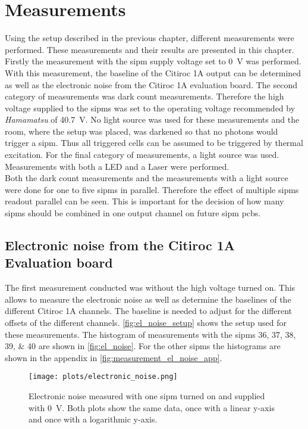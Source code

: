 \chapter{Measurements}

Using the setup described in the previous chapter, different measurements were performed. These measurements and their results are presented in this chapter.\\
Firstly the measurement with the \ac{sipm} supply voltage set to \SI{0}{\volt} was performed. With this measurement, the baseline of the Citiroc 1A output can be determined as well as the electronic noise from the Citiroc 1A evaluation board. The second category of measurements was dark count measurements. Therefore the high voltage supplied to the \ac{sipm}s was set to the operating voltage recommended by \textit{Hamamatsu} of \SI{40.7}{\volt}. No light source was used for these measurements and the room, where the setup was placed, was darkened so that no photons would trigger a \ac{sipm}. Thus all triggered cells can be assumed to be triggered by thermal excitation. For the final category of measurements, a light source was used. Measurements with both a LED and a Laser were performed.\\
Both the dark count measurements and the measurements with a light source were done for one to five \ac{sipm}s in parallel. Therefore the effect of multiple \ac{sipm}s readout parallel can be seen. This is important for the decision of how many \ac{sipm}s should be combined in one output channel on future \ac{sipm} \ac{pcb}s.

\section{Electronic noise from the Citiroc 1A Evaluation board}
The first measurement conducted was without the high voltage turned on. This allows to measure the electronic noise as well as determine the baselines of the different Citiroc 1A channels. The baseline is needed to adjust for the different offsets of the different channels. \autoref{fig:el_noise_setup} shows the setup used for these measurements. The histogram of measurements with the \ac{sipm}s \numlist{36;37;38;39;40} are shown in \autoref{fig:el_noise}. For the other \ac{sipm}s the histograms are shown in the appendix in \autoref{fig:measurement_el_noise_app}.\\


\begin{figure}
    \centering
    \texttt{[image: plots/electronic\_noise.png]}
    \caption[Electronic noise measurement]{Electronic noise measured with one \ac{sipm} turned on and supplied with \SI{0}{\volt}. Both plots show the same data, once with a linear y-axis and once with a logarithmic y-axis.}
    \label{fig:el_noise}
\end{figure}


